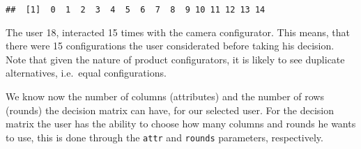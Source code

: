 \documentclass[]{article}
\begin{document}
\begin{verbatim}
##  [1]  0  1  2  3  4  5  6  7  8  9 10 11 12 13 14
\end{verbatim}

The user 18, interacted 15 times with the camera configurator. This
means, that there were 15 configurations the user considerated before
taking his decision. Note that given the nature of product
configurators, it is likely to see duplicate alternatives, i.e.~equal
configurations.

We know now the number of columns (attributes) and the number of rows
(rounds) the decision matrix can have, for our selected user. For the
decision matrix the user has the ability to choose how many columns and
rounds he wants to use, this is done through the \texttt{attr} and
\texttt{rounds} parameters, respectively.
\end{document}
